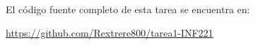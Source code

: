 El código fuente completo de esta tarea se encuentra en:

\url{https://github.com/Rextrere800/tarea1-INF221}